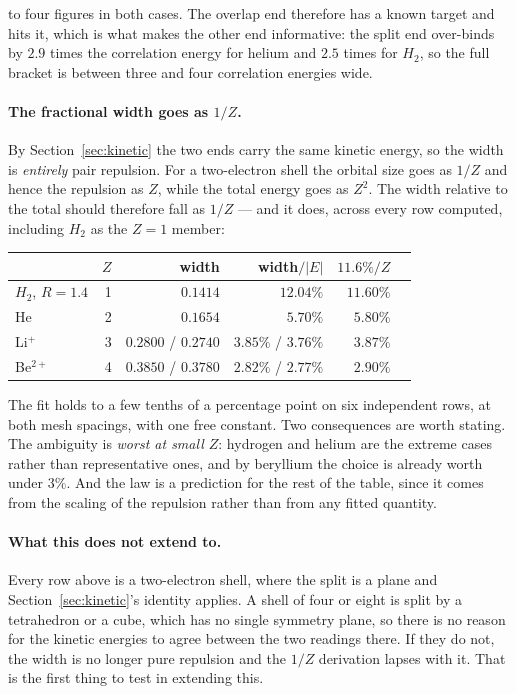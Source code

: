 \documentclass[11pt]{article}
\begin{document}
\noindent to four figures in both cases. The overlap end therefore has a known target and hits it,
which is what makes the other end informative: the split end over-binds by $2.9$ times the
correlation energy for helium and $2.5$ times for $H_2$, so the full bracket is between three and
four correlation energies wide.

\paragraph{The fractional width goes as $1/Z$.} By Section~\ref{sec:kinetic} the two ends carry the
same kinetic energy, so the width is \emph{entirely} pair repulsion. For a two-electron shell the
orbital size goes as $1/Z$ and hence the repulsion as $Z$, while the total energy goes as $Z^2$.
The width relative to the total should therefore fall as $1/Z$ --- and it does, across every row
computed, including $H_2$ as the $Z=1$ member:

\begin{center}\small
\begin{tabular}{lrrrrr}
\toprule
 & $Z$ & width & width$/|E|$ & $11.6\%/Z$ \\
\midrule
$H_2$, $R=1.4$ & 1 & $0.1414$ & $12.04\%$ & $11.60\%$ \\
He             & 2 & $0.1654$ & $5.70\%$  & $5.80\%$ \\
Li$^+$         & 3 & $0.2800$ / $0.2740$ & $3.85\%$ / $3.76\%$ & $3.87\%$ \\
Be$^{2+}$      & 4 & $0.3850$ / $0.3780$ & $2.82\%$ / $2.77\%$ & $2.90\%$ \\
\bottomrule
\end{tabular}
\end{center}

\noindent The fit holds to a few tenths of a percentage point on six independent rows, at both mesh
spacings, with one free constant. Two consequences are worth stating. The ambiguity is \emph{worst at
small $Z$}: hydrogen and helium are the extreme cases rather than representative ones, and by
beryllium the choice is already worth under $3\%$. And the law is a prediction for the rest of the
table, since it comes from the scaling of the repulsion rather than from any fitted quantity.

\paragraph{What this does not extend to.} Every row above is a two-electron shell, where the split
is a plane and Section~\ref{sec:kinetic}'s identity applies. A shell of four or eight is split by a
tetrahedron or a cube, which has no single symmetry plane, so there is no reason for the kinetic
energies to agree between the two readings there. If they do not, the width is no longer pure
repulsion and the $1/Z$ derivation lapses with it. That is the first thing to test in extending this.
\end{document}
